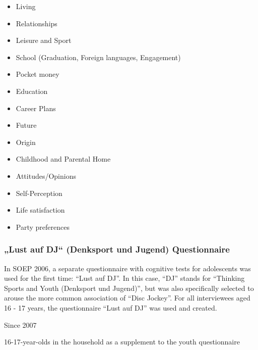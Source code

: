 \documentclass[letterpaper,10pt,openany,onesideH,english]{sphinxmanual}
\begin{document}
\begin{itemize}
\item {} 
Living

\item {} 
Relationships

\item {} 
Leisure and Sport

\item {} 
School (Graduation, Foreign languages, Engagement)

\item {} 
Pocket money

\item {} 
Education

\item {} 
Career Plans

\item {} 
Future

\item {} 
Origin

\item {} 
Childhood and Parental Home

\item {} 
Attitudes/Opinions

\item {} 
Self-Perception

\item {} 
Life satisfaction

\item {} 
Party preferences

\end{itemize}


\subsubsection{„Lust auf DJ“ (Denksport und Jugend) Questionnaire}
\label{\detokenize{Contents of SOEPcore/index:lust-auf-dj-denksport-und-jugend-questionnaire}}
In SOEP 2006, a separate questionnaire with cognitive tests for adolescents was used for the first time: “Lust auf DJ”. In this case, “DJ” stands for “Thinking Sports and Youth (Denksport und Jugend)”, but was also specifically selected to arouse the more common association of “Disc Jockey”. For all interviewees aged 16 - 17 years, the questionnaire “Lust auf DJ” was used and created.

 Since 2007

 16-17-year-olds in the household as a supplement to the youth questionnaire
\end{document}
